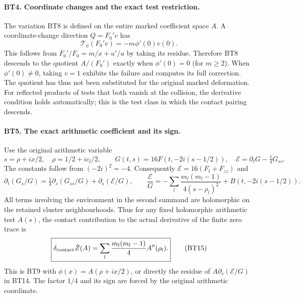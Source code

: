 \paragraph{BT4. Coordinate changes and the exact test restriction.}
The variation BT8 is defined on the entire marked coefficient
space $A$. A coordinate-change direction $Q=F_0'v$ has
\[
 \mathcal T_\phi(F_0'v)=-m\phi'(0)v(0).
 \tag{BT12}
\]
This follows from $F_0'/F_0=m/x+u'/u$ by taking its residue.
Therefore BT8 descends to the quotient $A/(F_0')$ exactly when
$\phi'(0)=0$ (for $m\ge2$). When $\phi'(0)\ne0$, taking
$v=1$ exhibits the failure and computes its full correction.
The quotient has thus not been substituted for the original marked
deformation. For reflected products of tests that both vanish at
the collision, the derivative condition holds automatically; this
is the test class in which the contact pairing descends.

\paragraph{BT5. The exact arithmetic coefficient and its sign.}
Use the original arithmetic variable
\[
 s=\rho+ix/2,\quad \rho=1/2+ic_l/2,\qquad
 G(t,s)=16F(t,-2i(s-1/2)),\quad
 \mathcal E=\partial_tG-\tfrac14G_{ss}.
 \tag{BT13}
\]
The constants follow from $(-2i)^2=-4$. Consequently
$\mathcal E=16(F_t+F_{zz})$ and
\[
 \partial_t(G_s/G)
 =\tfrac14\partial_s(G_{ss}/G)+\partial_s(\mathcal E/G),
 \qquad
 \frac{\mathcal E}{G}=-\sum_l\frac{m_l(m_l-1)}{4(s-\rho_l)^2}
                  +B(t,-2i(s-1/2)).
 \tag{BT14}
\]
All terms involving the environment in the second summand are
holomorphic on the retained cluster neighbourhoods. Thus for any
fixed holomorphic arithmetic test $A(s)$, the contact contribution
to the actual derivative of the finite zero trace is
\[
 \boxed{\delta_{\rm contact}\dot Z(A)
             =\sum_l\frac{m_l(m_l-1)}4 A''(\rho_l).}
 \tag{BT15}
\]
This is BT9 with $\phi(x)=A(\rho+ix/2)$, or directly the residue
of $A\partial_s(\mathcal E/G)$ in BT14. The factor $1/4$ and
its sign are forced by the original arithmetic coordinate.

